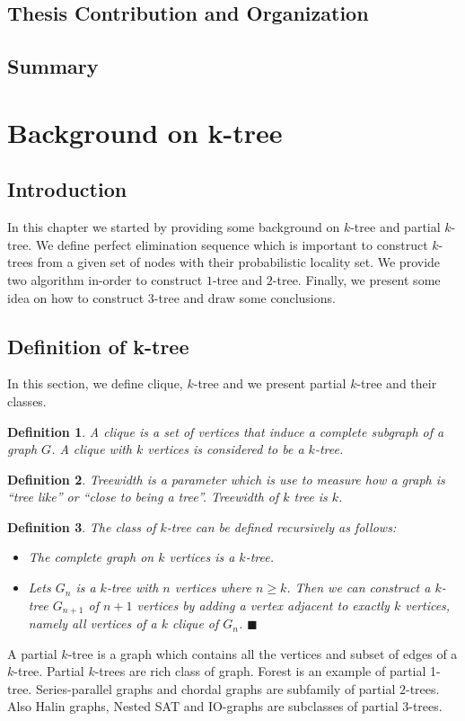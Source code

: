 \documentclass[12pt]{article}
\newtheorem*{defi}{Definition}
\begin{document}
\subsection{Thesis Contribution and Organization}
\subsection{Summary}
\section{Background on k-tree}
\subsection{Introduction}
In this chapter we started by providing some background on $k$-tree and partial $k$-tree. We define perfect elimination sequence which is important to construct $k$-trees from a given set of nodes with their probabilistic locality set. We provide two algorithm in-order to construct $1$-tree and $2$-tree. Finally, we present some idea on how to construct $3$-tree and draw some conclusions.
\label{sec:ktree}
\subsection{Definition of k-tree}
In this section, we define clique, $k$-tree and we present  partial $k$-tree and their classes.\\
\begin{defi}
A clique is a set of vertices that induce a complete subgraph of a graph \(G\). A clique with \(k\) vertices is considered to be a \(k\)-tree. 
\end{defi}
 \begin{defi}Treewidth is a parameter which is use to measure how a graph is ``tree like'' or ``close to being a tree''. Treewidth of \(k\) tree is \(k\).
\end{defi}
\begin{defi}
\normalfont
The class of  \(k\)-tree can be  defined recursively as follows: 
\begin{itemize}[noitemsep,nolistsep]
 \item The complete graph on $k$ vertices is a $k$-tree.
 \item Lets \(G_n\) is a \(k\)-tree  with $n$ vertices where $n\geq k$. Then we can construct a $k$-tree $G_{n+1}$ of $n+1$ vertices by adding a vertex adjacent to exactly $k$ vertices, namely all vertices of a $k$ clique of $G_n$. $\blacksquare$
\end{itemize}

\end{defi}
  A partial \(k\)-tree is a graph which contains all the vertices and subset of edges of a $k$-tree.  Partial \(k\)-trees are rich class of graph. Forest is an example of partial 1-tree. Series-parallel graphs and chordal graphs are subfamily of partial \(2\)-trees. Also Halin graphs, Nested SAT and IO-graphs are subclasses of partial \(3\)-trees. 
  
\end{document}
